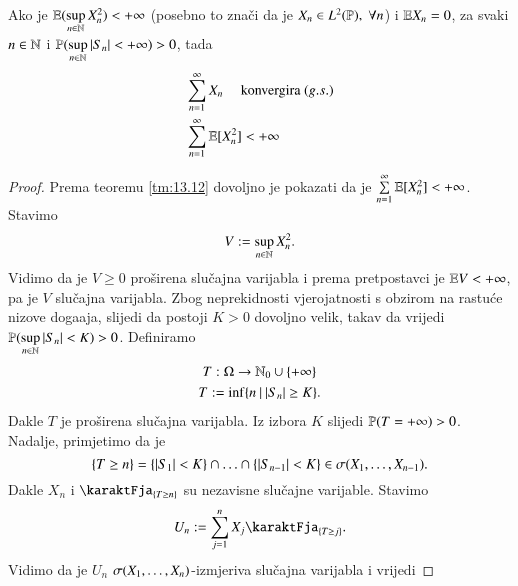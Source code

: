 \begin{prop}    \label{prop:13.13}
    Ako je $\mathbb{E} (\sup\limits_{n \in \mathbb{N}} X_n^2) < + \infty$ (posebno to zna\v ci da je $X_n \in L^2 (\mathbb{P}), \; \forall n$) i $\mathbb{E} X_n = 0$, za svaki $n \in \mathbb{N}$ i $\mathbb{P}({\sup\limits_{n \in \mathbb{N}} |S_n| < + \infty}) > 0$, tada
    \begin{equation*}
        \begin{aligned}
            & \sum\limits_{n = 1}^{\infty} X_n \quad \textnormal{ konvergira } (g.s.)\\
            & \sum\limits_{n = 1}^{\infty} \mathbb{E} [ X_n^2 ] < + \infty
        \end{aligned}
    \end{equation*}
\end{prop}

\begin{proof}
    Prema teoremu \ref{tm:13.12} dovoljno je pokazati da je $\sum\limits_{n = 1}^{\infty} \mathbb{E} [ X_n^2 ] < +\infty$.
    Stavimo
    \begin{equation*}
        V := \sup\limits_{n \in \mathbb{N}} X_n^2.
    \end{equation*}
    Vidimo da je $V \geq 0$ pro\v sirena slu\v cajna varijabla i prema pretpostavci je $\mathbb{E} V < +\infty$, pa je $V$ slu\v cajna varijabla.
    Zbog neprekidnosti vjerojatnosti s obzirom na rastu\' ce nizove doga\dj aja, slijedi da postoji $K > 0$ dovoljno velik, takav da vrijedi $\mathbb{P} ( \sup\limits_{n \in \mathbb{N}} |S_n| < K) > 0$.
    Definiramo
    \begin{equation*}
        \begin{gathered}
            T: \Omega \to \mathbb{N}_0 \cup \{+\infty\}\\
            T:= \inf \{{n} \: | \: {|S_n| \geq K}\}.
        \end{gathered}
    \end{equation*}
    Dakle $T$ je pro\v sirena slu\v cajna varijabla.
    Iz izbora $K$ slijedi $\mathbb{P} (T = +\infty) > 0$.
    Nadalje, primjetimo da je
    \begin{equation*}
        \{T \geq n\} = \{ |S_1| < K \} \cap \ldots \cap \{|S_{n-1}| < K\} \in \sigma({X_1, \ldots, X_{n-1}}).
    \end{equation*}
    Dakle $X_n$ i $\karaktFja_{\{T \geq n\}}$ su nezavisne slu\v cajne varijable.
    Stavimo
    \begin{equation*}
        U_n := \suma{j = 1}{n} X_j \karaktFja_{\{T \geq j\}}.
    \end{equation*}
    Vidimo da je $U_n$ $\sigma({X_1, \ldots, X_n})$-izmjeriva slu\v cajna varijabla i vrijedi

\end{proof}

